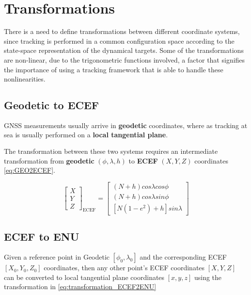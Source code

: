 \section{Transformations}

There is a need to define transformations between different coordinate systems, since tracking is performed in a common configuration space according to the state-space representation of the dynamical targets. Some of the transformations are non-linear, due to the trigonometric functions involved, a factor that signifies the importance of using a tracking framework that is able to handle these nonlinearities.

\subsection{Geodetic to ECEF}

GNSS measurements usually arrive in  \textbf{geodetic} coordinates, where as tracking at sea is usually performed on a \textbf{local tangential plane}.


The transformation between these two systems requires an intermediate transformation from \textbf{geodetic} $(\phi,\lambda,h)$ to \textbf{ECEF}   $(X,Y,Z)$ coordinates \ref{eq:GEO2ECEF}.

\begin{equation} \label{eq:GEO2ECEF}
	\begin{bmatrix}
	X\\
	Y\\
	Z
	\end{bmatrix}_{\text{ECEF}} =
	\begin{bmatrix}
	(N+h)cos\lambda cos\phi \\
	(N+h)cos\lambda sin\phi \\
	[N(1-e^2)+h] sin\lambda	
	\end{bmatrix}
\end{equation}


\subsection{ECEF to ENU}



Given a reference point in Geodetic $[\phi_0,\lambda_0]$ and the corresponding ECEF $[X_0,Y_0,Z_0]$ coordinates, then any other point's ECEF coordinates $[X,Y,Z]$ can be converted to local tangential plane coordinates $[x,y,z]$ using the transformation in \ref{eq:transformation_ECEF2ENU}


